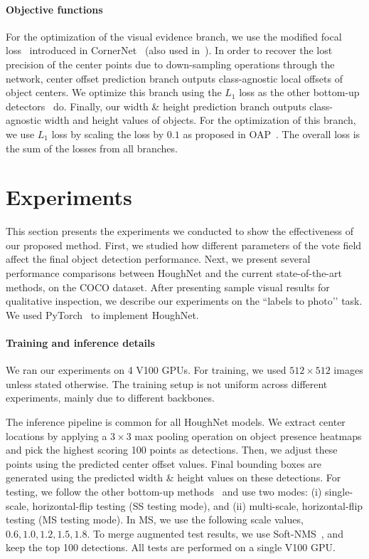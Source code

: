\documentclass[runningheads]{llncs}
\begin{document}
\paragraph{\textbf{Objective functions}} For the optimization of the visual evidence branch, we use the modified focal loss~\cite{retinanet} introduced in CornerNet~\cite{cornernet} (also used in~\cite{extremenet, centernet}).  In order to recover the lost precision of the center points due to down-sampling operations through the network, center offset prediction branch outputs class-agnostic local offsets of object centers. We optimize this branch using the  $L_{1}$ loss as the other bottom-up detectors~\cite{cornernet, extremenet, centernet} do. Finally, our width \& height prediction branch outputs class-agnostic width and height values of objects. For the optimization of this branch, we use  $L_{1}$ loss by scaling the loss by $0.1$ as proposed in OAP~\cite{centernet}. The overall loss is the sum of the losses from all branches.


\section{Experiments}
\label{sec:exp}




This section presents the experiments we conducted to show the effectiveness of our proposed method. First, we studied how different parameters of the vote field affect the final object detection performance. Next, we present several performance comparisons between HoughNet and the current state-of-the-art methods, on the COCO dataset. After presenting sample visual results for qualitative inspection, we describe our experiments on the ``labels to photo’’ task. We used PyTorch~\cite{pytorch} to implement HoughNet. 




\paragraph{\textbf{Training and inference details}} We ran our experiments on 4 V100 GPUs. For training, we used $512\times512$ images unless stated otherwise. The training setup is not uniform across different experiments, mainly due to different backbones. 




The inference pipeline is common for all HoughNet models.  We extract center locations by applying a $3\times 3$ max pooling operation on object presence heatmaps and pick the highest scoring 100 points as detections. Then, we adjust these points using the predicted center offset values. Final bounding boxes are generated using the predicted width \& height values on these detections.
For testing, we follow the other bottom-up methods~\cite{extremenet, centernet, cornernet} and use two modes: (i) single-scale, horizontal-flip testing (SS testing mode), and (ii) multi-scale, horizontal-flip testing (MS testing mode). In MS, we use the following scale values, $0.6,1.0, 1.2, 1.5, 1.8$. To merge augmented test results, we use Soft-NMS~\cite{softnms}, and keep the top 100 detections. All tests are performed on a single V100 GPU. 
\end{document}
